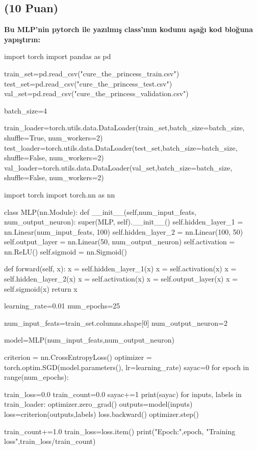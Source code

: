 \documentclass[11pt]{article}
\begin{document}
\subsection{(10 Puan)} \textbf{Bu MLP'nin pytorch ile yazılmış class'ının kodunu aşağı kod bloğuna yapıştırın:}

\begin{python}
import torch
import pandas as pd

train_set=pd.read_csv("cure_the_princess_train.csv")
test_set=pd.read_csv("cure_the_princess_test.csv")
val_set=pd.read_csv("cure_the_princess_validation.csv")

batch_size=4

train_loader=torch.utils.data.DataLoader(train_set,batch_size=batch_size, shuffle=True, num_workers=2)
test_loader=torch.utils.data.DataLoader(test_set,batch_size=batch_size, shuffle=False, num_workers=2)
val_loader=torch.utils.data.DataLoader(val_set,batch_size=batch_size, shuffle=False, num_workers=2)

import torch
import torch.nn as nn

class MLP(nn.Module):
    def __init__(self,num_input_feats, num_output_neuron):
        super(MLP, self).__init__()
        self.hidden_layer_1 = nn.Linear(num_input_feats, 100)
        self.hidden_layer_2 = nn.Linear(100, 50)
        self.output_layer = nn.Linear(50, num_output_neuron)
        self.activation = nn.ReLU()
        self.sigmoid = nn.Sigmoid()

    def forward(self, x):
        x = self.hidden_layer_1(x)
        x = self.activation(x)
        x = self.hidden_layer_2(x)
        x = self.activation(x)
        x = self.output_layer(x)
        x = self.sigmoid(x)
        return x

        learning_rate=0.01
num_epochs=25

num_input_feats=train_set.columns.shape[0]
num_output_neuron=2

model=MLP(num_input_feats,num_output_neuron)

criterion = nn.CrossEntropyLoss()
optimizer = torch.optim.SGD(model.parameters(), lr=learning_rate)
sayac=0
for epoch in range(num_epochs):
    
    train_loss=0.0
    train_count=0.0
    sayac+=1
    print(sayac)
    for inputs, labels in train_loader:
        optimizer.zero_grad()
        outputs=model(inputs)
        loss=criterion(outputs,labels)
        loss.backward()
        optimizer.step()
        
        train_count+=1.0
        train_loss=loss.item()
    print("Epoch:",epoch, "Training loss",train_loss/train_count)
\end{python}
\end{document}
